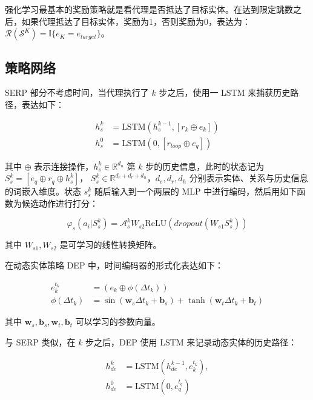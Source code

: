 \documentclass[a4paper, AutoFakeBold]{article}
\begin{document}
强化学习最基本的奖励策略就是看代理是否抵达了目标实体。在达到限定跳数之后，如果代理抵达了目标实体，奖励为1，否则奖励为0，表达为：${\mathcal R}({\mathcal S}^K)={{\mathbb I}\{e_K=e_{target}\}}$。


\subsection{策略网络}

SERP 部分不考虑时间，当代理执行了 $k$ 步之后，使用一 LSTM 来捕获历史路径，表达如下：

\begin{equation}
	\begin{aligned}
h^k_s & =\text{LSTM}(h_s^{k-1},[r_k\oplus e_k]) \\ 
h^0_s & =\text{LSTM}(0,[r_{loop}\oplus e_q])
	\end{aligned}
\end{equation}

其中 $\oplus$ 表示连接操作，$h_s^k\in{\mathbb R}^{d_n}$ 第 $k$ 步的历史信息，此时的状态记为$S_s^k=[e_q\oplus r_q \oplus h^k_s]$， $S_s^k\in{\mathbb R}^{d_e+d_r+d_h}$，$d_e,d_r,d_h$ 分别表示实体、关系与历史信息的词嵌入维度。状态 $s_s^k$ 随后输入到一个两层的 MLP 中进行编码，然后用如下函数为候选动作进行打分：

\begin{equation}
\varphi_s(a_i|S^k_s)={\mathcal A}_s^k W_{s2}\text{ReLU}(dropout(W_{s1}S^k_s))
\end{equation}

其中 $W_{s1},W_{s2}$ 是可学习的线性转换矩阵。

在动态实体策略 DEP 中，时间编码器的形式化表达如下：

\begin{equation}
	\begin{aligned}
e_k^{t_k} & =(e_k\oplus\phi(\Delta t_k)) \\ 
\phi(\Delta t_k) & =\sin({\boldsymbol w}_s\Delta t_k+{\boldsymbol b}_s)+\tanh({\boldsymbol w}_t\Delta t_k+{\boldsymbol b}_t)
	\end{aligned}
\end{equation}

其中 ${\boldsymbol w}_s,{\boldsymbol b}_s,{\boldsymbol w}_t,{\boldsymbol b}_t$ 可以学习的参数向量。

与 SERP 类似，在 $k$ 步之后，DEP 使用 LSTM 来记录动态实体的历史路径：

\begin{equation}
	\begin{aligned}
h^k_{de} & =\text{LSTM}(h_{de}^{k-1},e_k^{t_k}), \\ 
h^0_{de} & =\text{LSTM}(0,e_q^{t_q})
	\end{aligned}
\end{equation}
\end{document}
